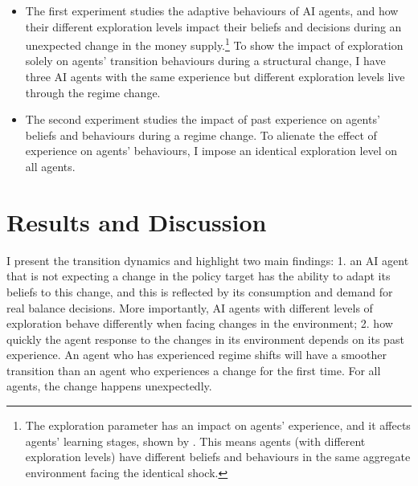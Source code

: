 \documentclass[hidelinks]{article}
\begin{document}
 \begin{itemize}
     \item The first experiment studies the adaptive behaviours of AI agents, and how their different exploration levels impact their beliefs and decisions during an unexpected change in the money supply.\footnote{The exploration parameter has an impact on agents' experience, and it affects agents' learning stages, shown by \cite{Shi2021learning}. This means agents (with different exploration levels) have different beliefs and behaviours in the same aggregate environment facing the identical shock.} To show the impact of exploration solely on agents' transition behaviours during a structural change, I have three AI agents with the same experience but different exploration levels live through the regime change.  
     
     
     \item The second experiment studies the impact of past experience on agents' beliefs and behaviours during a regime change. To alienate the effect of experience on agents' behaviours, I impose an identical exploration level on all agents.
 \end{itemize}
 


 

	



\section{Results and Discussion}
\label{results}

I present the transition dynamics and highlight two main findings: 1. an AI agent that is not expecting a change in the policy target has the ability to adapt its beliefs to this change, and this is reflected by its consumption and demand for real balance decisions. More importantly, AI agents with different levels of exploration behave differently when facing changes in the environment; 2. how quickly the agent response to the changes in its environment depends on its past experience. An agent who has experienced regime shifts will have a smoother transition than an agent who experiences a change for the first time. For all agents, the change happens unexpectedly.
\end{document}
